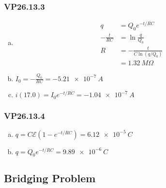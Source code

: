 \documentclass{article}
\begin{document}
\subsubsection{VP26.13.3}

\begin{enumerate}[(a)]
  \item

        \begin{align*}
          q              & = Q_0 e^{-t / R C}           \\
          -\frac{t}{R C} & = \ln \frac{q}{Q_0}          \\
          R              & = -\frac{t}{C \ln (q / Q_0)} \\
                         & = \qty{1.32}{M\Omega}
        \end{align*}

  \item $I_0 = -\frac{Q_0}{R C} = \qty{-5.21e-7}{A}$

  \item $i(17.0) = I_0 e^{-t / R C} = \qty{-1.04e-7}{A}$
\end{enumerate}

\subsubsection{VP26.13.4}

\begin{enumerate}[(a)]
  \item $q = C \mathcal{E} (1 - e^{-t / R C}) = \qty{6.12e-5}{C}$

  \item $q = Q_0 e^{-t / R C} = \qty{9.89e-6}{C}$
\end{enumerate}

\subsection{Bridging Problem}
\end{document}
